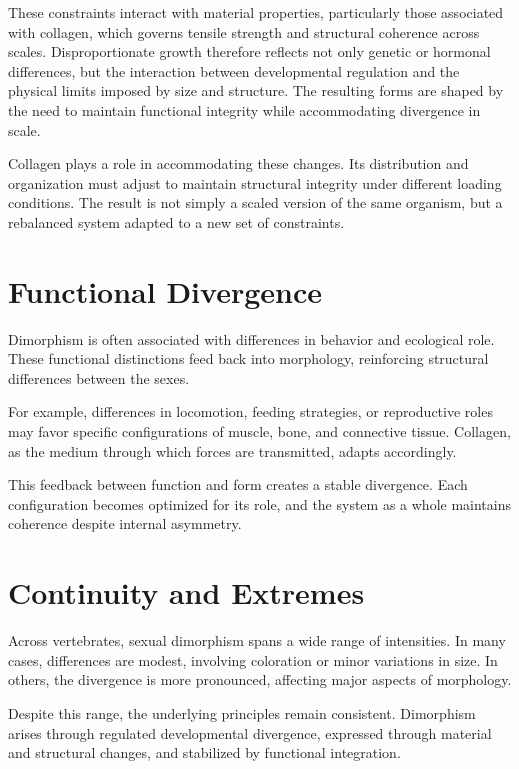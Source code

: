 \documentclass[11pt,oneside]{book}
\begin{document}
These constraints interact with material properties, particularly those associated with collagen, which governs tensile strength and structural coherence across scales. Disproportionate growth therefore reflects not only genetic or hormonal differences, but the interaction between developmental regulation and the physical limits imposed by size and structure. The resulting forms are shaped by the need to maintain functional integrity while accommodating divergence in scale.

Collagen plays a role in accommodating these changes. Its distribution and organization must adjust to maintain structural integrity under different loading conditions. The result is not simply a scaled version of the same organism, but a rebalanced system adapted to a new set of constraints.

\section{Functional Divergence}

Dimorphism is often associated with differences in behavior and ecological role. These functional distinctions feed back into morphology, reinforcing structural differences between the sexes.

For example, differences in locomotion, feeding strategies, or reproductive roles may favor specific configurations of muscle, bone, and connective tissue. Collagen, as the medium through which forces are transmitted, adapts accordingly.

This feedback between function and form creates a stable divergence. Each configuration becomes optimized for its role, and the system as a whole maintains coherence despite internal asymmetry.

\section{Continuity and Extremes}

Across vertebrates, sexual dimorphism spans a wide range of intensities. In many cases, differences are modest, involving coloration or minor variations in size. In others, the divergence is more pronounced, affecting major aspects of morphology.

Despite this range, the underlying principles remain consistent. Dimorphism arises through regulated developmental divergence, expressed through material and structural changes, and stabilized by functional integration.
\end{document}
